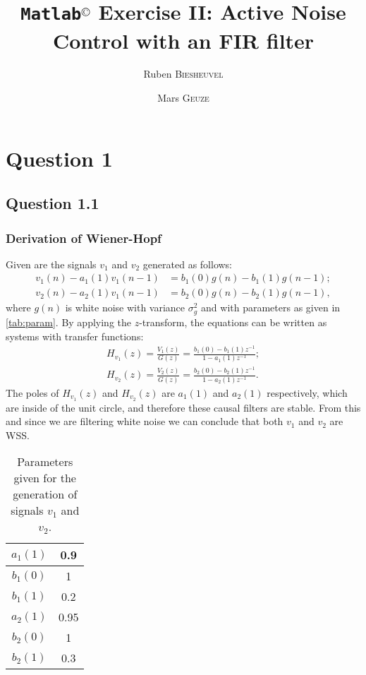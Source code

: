 \documentclass[12pt,a4paper]{article}
\title{\textbf{\texttt{Matlab}$^\text{{\fontsize{12}{1em}\textcopyright}}$ Exercise II: Active Noise Control with an FIR filter}}
\author[$\dagger$]{Ruben \textsc{Biesheuvel}}
\author[$\ddagger$]{Mars \textsc{Geuze}}
\affil[$\dagger$]{Student number 4076680}
\affil[$\ddagger$]{Student number 4109139}
\begin{document}
	\maketitle

\section*{Question 1}
\subsection*{Question 1.1}
\subsubsection*{Derivation of Wiener-Hopf}
Given are the signals $v_1$ and $v_2$ generated as follows:
\begin{align}
v_1(n) - a_1(1)v_1(n-1) &= b_1(0)g(n) - b_1(1)g(n-1);\\
v_2(n) - a_2(1)v_1(n-1) &= b_2(0)g(n) - b_2(1)g(n-1),
\end{align}
where $g(n)$ is white noise with variance $\sigma^2_g$ and with parameters as given in \autoref{tab:param}. By applying the $z$-transform, the equations can be written as systems with transfer functions:
\begin{align}\label{eq:H}
H_{v_1}(z) = \frac{V_1(z)}{G(z)} = \frac{b_1(0) - b_1(1)z^{-1}}{1 - a_1(1)z^{-1}};\\
H_{v_2}(z) = \frac{V_2(z)}{G(z)} = \frac{b_2(0) - b_2(1)z^{-1}}{1 - a_2(1)z^{-1}}.
\end{align}
The poles of $H_{v_1}(z)$ and $H_{v_2}(z)$ are $a_1(1)$ and $a_2(1)$ respectively, which are inside of the unit circle, and therefore these causal filters are stable. From this and since we are filtering white noise we can conclude that both $v_1$ and $v_2$ are WSS. 
\begin{table}
\centering
\caption{\label{tab:param}Parameters given for the generation of signals $v_1$ and $v_2$.}
\begin{tabular}{|c|c|}
\hline
$a_1(1)$ & 0.9\\\hline
$b_1(0)$ & 1\\\hline
$b_1(1)$ & 0.2\\\hline
$a_2(1)$ & 0.95\\\hline
$b_2(0)$ & 1\\\hline
$b_2(1)$ & 0.3\\\hline
\end{tabular}
\end{table}
\end{document}
